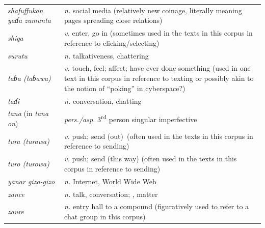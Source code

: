 \documentclass[output=paper,newtxmath,modfonts,nonflat,hidelinks]{langsci/langscibook}
\begin{document}
\noindent
\begin{tabularx}{\textwidth}{lQ}
\textit{shafuffukan yaɗa zumunta} & \textit{n.} social media (relatively new coinage, literally meaning pages spreading close relations)\\
\textit{shiga} & \textit{v.} enter, go in (sometimes used in the texts in this corpus in reference to clicking/selecting)\\
\textit{surutu} & \textit{n.} talkativeness, chattering\\
\textit{taɓa (taɓawa)} & \textit{v.} touch, feel; affect; have ever done something (used in one text in this corpus in reference to texting or possibly akin to the notion of “poking” in cyberspace?) \\
\textit{taɗi} & \textit{n.} conversation, chatting\\
\textit{tana} (in \textit{tana on}) & \textit{pers./asp.} 3\textsuperscript{rd} person singular  imperfective\\
\textit{tura (turawa)} & \textit{v.} push; send (out)~(often used in the texts in this corpus in reference to sending)\\
\textit{turo (turowa)} & \textit{v.} push; send (this way) (often used in the texts in this corpus in reference to sending)\\
\textit{yanar gizo-gizo} & \textit{n.} Internet, World Wide Web \\
\textit{zance} & \textit{n.} talk, conversation; , matter \\
\textit{zaure} & \textit{n.} entry hall to a compound (figuratively used to refer to a chat group in this corpus)\\
\end{tabularx}


\sloppy
\printbibliography[heading=subbibliography,notkeyword=this]
\end{document}
